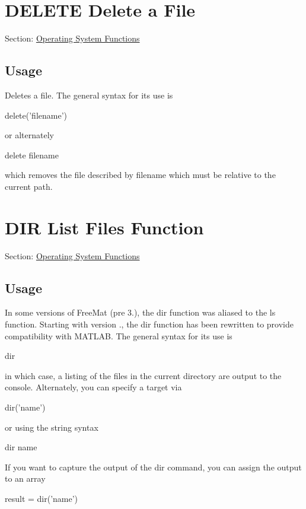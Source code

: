  \hypertarget{os_delete}{}\section{D\-E\-L\-E\-T\-E Delete a File}\label{os_delete}
Section\-: \hyperlink{sec_os}{Operating System Functions} \hypertarget{vtkwidgets_vtkxyplotwidget_Usage}{}\subsection{Usage}\label{vtkwidgets_vtkxyplotwidget_Usage}
Deletes a file. The general syntax for its use is \begin{DoxyVerb}  delete('filename')
\end{DoxyVerb}
 or alternately \begin{DoxyVerb}  delete filename
\end{DoxyVerb}
 which removes the file described by {\ttfamily filename} which must be relative to the current path. \hypertarget{os_dir}{}\section{D\-I\-R List Files Function}\label{os_dir}
Section\-: \hyperlink{sec_os}{Operating System Functions} \hypertarget{vtkwidgets_vtkxyplotwidget_Usage}{}\subsection{Usage}\label{vtkwidgets_vtkxyplotwidget_Usage}
In some versions of Free\-Mat (pre 3.), the {\ttfamily dir} function was aliased to the {\ttfamily ls} function. Starting with version {.}, the {\ttfamily dir} function has been rewritten to provide compatibility with M\-A\-T\-L\-A\-B. The general syntax for its use is \begin{DoxyVerb}  dir
\end{DoxyVerb}
 in which case, a listing of the files in the current directory are output to the console. Alternately, you can specify a target via \begin{DoxyVerb}  dir('name')
\end{DoxyVerb}
 or using the string syntax \begin{DoxyVerb}  dir name
\end{DoxyVerb}
 If you want to capture the output of the {\ttfamily dir} command, you can assign the output to an array \begin{DoxyVerb}  result = dir('name')
\end{DoxyVerb}
